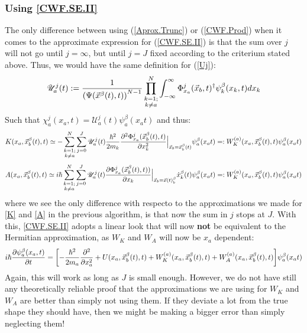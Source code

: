 \documentclass[11pt, a4paper]{article} %
\newcommand{\U}{\mathscr{U}}
\begin{document}
\subsubsection{Using \ref{CWF.SE.II}}
The only difference between using (\ref{Aprox.Trunc}) or (\ref{CWF.Prod}) when it comes to the approximate expression for (\ref{CWF.SE.II}) is that the sum over $j$ will not go until $j=\infty$, but until $j=J$ fixed according to the criterium stated above. Thus, we would have the same definition for (\ref{Uj}):
$$
\U^j_a(t):=\frac{1}{ \qty(\Psi(\vec{x}^\beta(t),t))^{N-1}}\prod_{\substack{k=1; \\ k\neq a}}^{N} \int_{-\infty}^\infty \Phi_{x_a}^j(\vec{x}_b,t)^\dagger \psi^\beta_k(x_k,t) dx_k 
$$
Such that $\chi_a^j(x_a,t)= \U^j_a(t)\psi_a^\beta(x_a t)$ and thus:
$$
K(x_a, \vec{x}_b^\beta(t), t) \simeq - \sum_{\substack{k=1; \\ k\neq a}}^{N} \sum_{j=0}^J \U^j_a(t) \frac{\hbar^2}{2m_k} \pdv[2]{ \Phi_{x_a}^j(\vec{x}_b^\beta(t),t)}{x_k}\Big\rvert_{\vec{x}_b=\vec{x}_b^\beta(t)}\psi_a^\beta(x_a t)=:W_K^{(a)}(x_a, \vec{x}_b^\beta (t),t)\psi_a^\beta(x_a t)
$$
$$
A(x_a, \vec{x}_b^\beta(t), t) \simeq i \hbar \sum_{\substack{k=1; \\ k\neq a}}^{N} \sum_{j=0}^J \U^j_a(t) \pdv{ \Phi_{x_a}^j(\vec{x}_b^\beta(t),t))}{x_k}\Big\rvert_{\vec{x}_b=\vec{x}(t)_b^\beta} \dot{x}_k^\beta(t)\psi_a^\beta(x_a t)=:W_K^{(a)}(x_a, \vec{x}_b^\beta (t),t)\psi_a^\beta(x_a t)
$$
where we see the only difference with respecto to the approximations we made for \ref{K} and \ref{A} in the previous algorithm, is that now the sum in $j$ stops at $J$. With this, \ref{CWF.SE.II} adopts a linear look that will now {\bf not} be equivalent to the Hermitian approximation, as $W_K$ and $W_A$ will now be $x_a$ dependent:
$$
i\hbar \pdv{\psi_a^\beta(x_a, t)}{t} = \qty[- \frac{\hbar^2}{2m_a}\pdv[2]{}{x_a} + U(x_a, \vec{x}_b^\beta(t), t)+ W^{(a)}_K(x_a,\vec{x}_b^\beta (t),t) +W^{(a)}_A(x_a,\vec{x}_b^\beta (t),t) ]\psi_a^\beta(x_a t)
$$
Again, this will work as long as $J$ is small enough. However, we do not have still any theoretically reliable proof that the approximations we are using for $W_K$ and $W_A$ are better than simply not using them. If they deviate a lot from the true shape they should have, then we might be making a bigger error than simply neglecting them!
\end{document}

